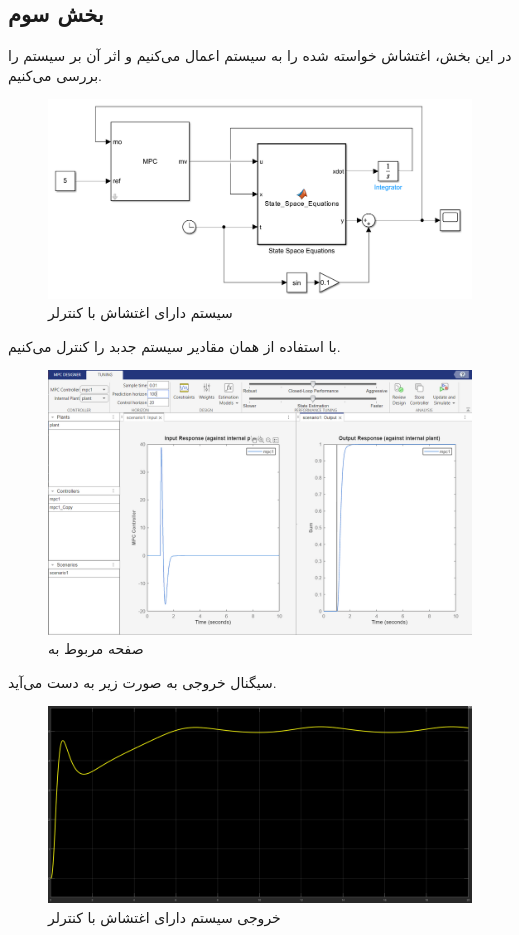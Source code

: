 \documentclass[14pt, a4paper]{extarticle}
\begin{document}
\subsection{بخش سوم}
در این بخش، اغتشاش خواسته شده را به سیستم اعمال می‌کنیم و اثر آن بر سیستم را بررسی می‌کنیم.\\
\begin{figure}[h!]
	\centering
	\includegraphics[scale = 0.6]{Q1_3_sim.png}
	\caption{سیستم دارای اغتشاش با کنترلر 
		}
\end{figure}

با استفاده از همان مقادیر سیستم جدبد را کنترل می‌کنیم.
\begin{figure}[h!]
	\centering
	\includegraphics[scale = 0.5]{Q1_3_mpc.png}
	\caption{صفحه مربوط به 
		}
\end{figure}

\newpage

سیگنال خروجی به صورت زیر به دست می‌آید.
\begin{figure}[h!]
	\centering
	\includegraphics[scale = 0.4]{Q1_3_result.png}
	\caption{خروجی سیستم دارای اغتشاش با کنترلر 
		}
\end{figure}
\end{document}
